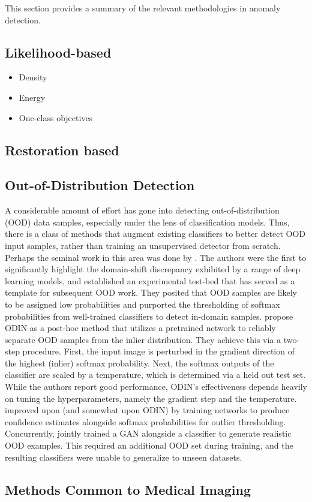 This section provides a summary of the relevant methodologies in anomaly detection.

\subsection{Likelihood-based}
\begin{itemize}
    \item Density 
    \item Energy
    \item One-class objectives
\end{itemize}

\subsection{Restoration based}

\subsection{Out-of-Distribution Detection}
A considerable amount of effort has gone into detecting out-of-distribution (OOD) data samples, especially under the lens of classification models. Thus, there is a class of methods that augment existing classifiers to better detect OOD input samples, rather than training an unsupervised detector from scratch. Perhaps the seminal work in this area was done by \cite{Hendrycks2019}. The authors were the first to significantly highlight the domain-shift discrepancy exhibited by a range of deep learning models, and established an experimental test-bed that has served as a template for subsequent OOD work. They posited that OOD samples are likely to be assigned low probabilities and purported the thresholding of softmax probabilities from well-trained classifiers to detect in-domain samples. \cite{Liang2017} propose ODIN as a post-hoc method that utilizes a pretrained network to reliably separate OOD samples from the inlier distribution. They achieve this via a two-step procedure. First, the input image is perturbed in the gradient direction of the highest (inlier) softmax probability. Next, the softmax outputs of the classifier are scaled by a temperature, which is determined via a held out test set. While the authors report good performance, ODIN's effectiveness depends heavily on tuning the hyperparameters, namely the gradient step and the temperature. \cite{devries2018learning} improved upon \cite{Hendrycks2019} (and somewhat upon ODIN) by training networks to produce confidence estimates alongside softmax probabilities for outlier thresholding. Concurrently, \cite{Lee2018} jointly trained a GAN alongside a classifier to generate realistic OOD examples. This required an additional OOD set during training, and the resulting classifiers were unable to generalize to unseen datasets.


\subsection{Methods Common to Medical Imaging}
